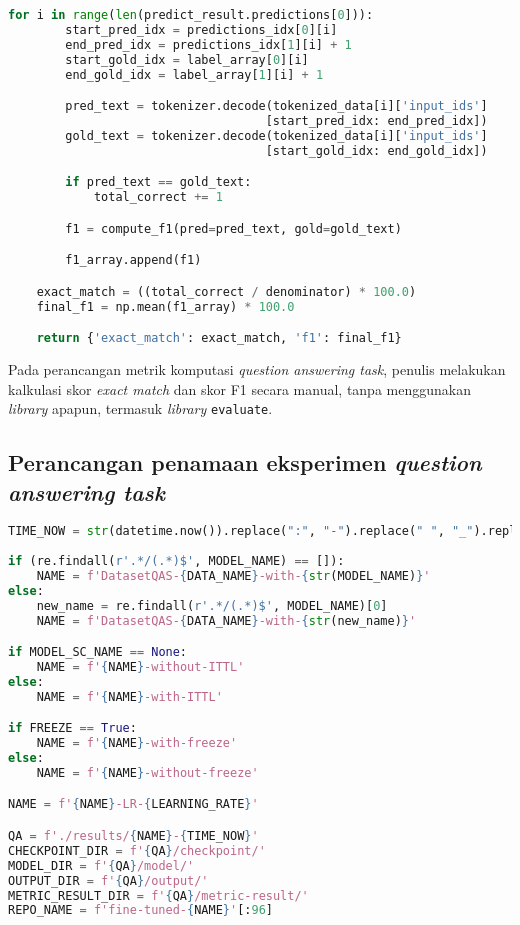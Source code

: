 \begin{lstlisting}[language=Python, caption=Perancangan metrik komputasi untuk penilaian \emph{question answering task}]
    for i in range(len(predict_result.predictions[0])):
        start_pred_idx = predictions_idx[0][i]
        end_pred_idx = predictions_idx[1][i] + 1
        start_gold_idx = label_array[0][i]
        end_gold_idx = label_array[1][i] + 1

        pred_text = tokenizer.decode(tokenized_data[i]['input_ids']
                                    [start_pred_idx: end_pred_idx])
        gold_text = tokenizer.decode(tokenized_data[i]['input_ids']
                                    [start_gold_idx: end_gold_idx])

        if pred_text == gold_text:
            total_correct += 1

        f1 = compute_f1(pred=pred_text, gold=gold_text)

        f1_array.append(f1)

    exact_match = ((total_correct / denominator) * 100.0)
    final_f1 = np.mean(f1_array) * 100.0

    return {'exact_match': exact_match, 'f1': final_f1}
\end{lstlisting}

Pada perancangan metrik komputasi \emph{question answering task}, penulis melakukan kalkulasi skor \emph{exact match} dan skor F1 secara manual, tanpa menggunakan \emph{library} apapun, termasuk \emph{library} \texttt{evaluate}.

\subsection{Perancangan penamaan eksperimen \emph{question answering task}}
\begin{lstlisting}[language=Python, caption=Perancangan penamaan eksperimen \emph{question answering task}]
TIME_NOW = str(datetime.now()).replace(":", "-").replace(" ", "_").replace(".", "_")
    
if (re.findall(r'.*/(.*)$', MODEL_NAME) == []): 
    NAME = f'DatasetQAS-{DATA_NAME}-with-{str(MODEL_NAME)}'
else:
    new_name = re.findall(r'.*/(.*)$', MODEL_NAME)[0]
    NAME = f'DatasetQAS-{DATA_NAME}-with-{str(new_name)}'

if MODEL_SC_NAME == None:
    NAME = f'{NAME}-without-ITTL'
else:
    NAME = f'{NAME}-with-ITTL'

if FREEZE == True:
    NAME = f'{NAME}-with-freeze'
else:
    NAME = f'{NAME}-without-freeze'

NAME = f'{NAME}-LR-{LEARNING_RATE}'

QA = f'./results/{NAME}-{TIME_NOW}'
CHECKPOINT_DIR = f'{QA}/checkpoint/'
MODEL_DIR = f'{QA}/model/'
OUTPUT_DIR = f'{QA}/output/'
METRIC_RESULT_DIR = f'{QA}/metric-result/'
REPO_NAME = f'fine-tuned-{NAME}'[:96]
\end{lstlisting}

